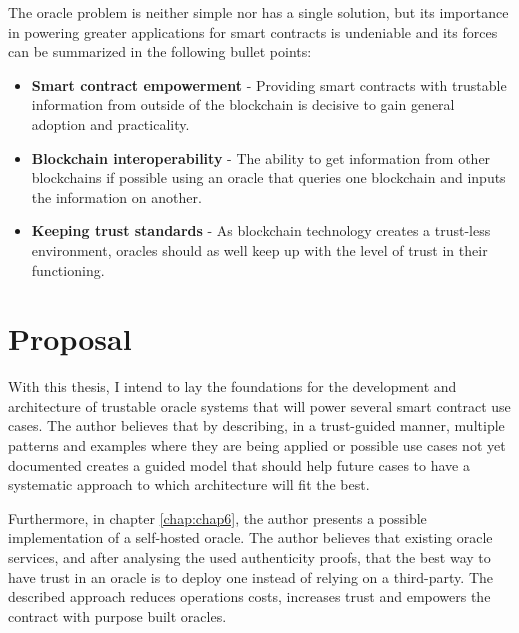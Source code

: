 The oracle problem is neither simple nor has a single solution, but its importance in powering greater applications for smart contracts is undeniable and its forces can be summarized in the following bullet points:


\begin{itemize}
    \item \textbf{Smart contract empowerment} - Providing smart contracts with trustable information from outside of the blockchain is decisive to gain general adoption and practicality.
    \item \textbf{Blockchain interoperability} - The ability to get information from other blockchains if possible using an oracle that queries one blockchain and inputs the information on another.
    \item \textbf{Keeping trust standards} - As blockchain technology creates a trust-less environment, oracles should as well keep up with the level of trust in their functioning.
\end{itemize}

\section{Proposal}

With this thesis, I intend to lay the foundations for the development and architecture of trustable oracle systems that will power several smart contract use cases. The author believes that by describing, in a trust-guided manner, multiple patterns and examples where they are being applied or possible use cases not yet documented creates a guided model that should help future cases to have a systematic approach to which architecture will fit the best.

Furthermore, in chapter \ref{chap:chap6}, the author presents a possible implementation of a self-hosted oracle. The author believes that existing oracle services, and after analysing the used authenticity proofs, that the best way to have trust in an oracle is to deploy one instead of relying on a third-party. The described approach reduces operations costs, increases trust and empowers the contract with purpose built oracles.